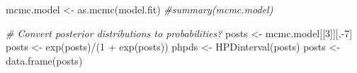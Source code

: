 \documentclass[
]{article}
\newenvironment{Shaded}{\begin{snugshade}}{\end{snugshade}}
\newcommand{\CommentTok}[1]{\textcolor[rgb]{0.56,0.35,0.01}{\textit{#1}}}
\newcommand{\DecValTok}[1]{\textcolor[rgb]{0.00,0.00,0.81}{#1}}
\newcommand{\FunctionTok}[1]{\textcolor[rgb]{0.00,0.00,0.00}{#1}}
\newcommand{\NormalTok}[1]{#1}
\newcommand{\OtherTok}[1]{\textcolor[rgb]{0.56,0.35,0.01}{#1}}
\newcommand{\SpecialCharTok}[1]{\textcolor[rgb]{0.00,0.00,0.00}{#1}}
\begin{document}
\begin{Shaded}
\begin{Highlighting}[]
\NormalTok{mcmc.model }\OtherTok{\textless{}{-}} \FunctionTok{as.mcmc}\NormalTok{(model.fit)}
\CommentTok{\#summary(mcmc.model)}

\CommentTok{\# Convert posterior distributions to probabilities?}
\NormalTok{posts }\OtherTok{\textless{}{-}}\NormalTok{ mcmc.model[[}\DecValTok{3}\NormalTok{]][,}\SpecialCharTok{{-}}\DecValTok{7}\NormalTok{] }
\NormalTok{posts }\OtherTok{\textless{}{-}} \FunctionTok{exp}\NormalTok{(posts)}\SpecialCharTok{/}\NormalTok{(}\DecValTok{1} \SpecialCharTok{+} \FunctionTok{exp}\NormalTok{(posts))}
\NormalTok{phpds }\OtherTok{\textless{}{-}} \FunctionTok{HPDinterval}\NormalTok{(posts)}
\NormalTok{posts }\OtherTok{\textless{}{-}} \FunctionTok{data.frame}\NormalTok{(posts)}


\end{Highlighting}
\end{Shaded}
\end{document}
